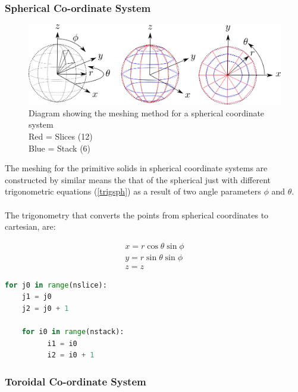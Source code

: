 \documentclass[12pt,a4paper]{article}
\begin{document}
\newpage
\subsubsection{Spherical Co-ordinate System}

\begin{figure}[h!]
\centering
\includegraphics[scale=0.5]{Images//Coords//sph.png}
\caption[width=\columnwidth]{Diagram showing the meshing method for a spherical coordinate system\\
Red = Slices (12)\\
Blue = Stack (6)}
\label{sphmeshin}
\end{figure}

The meshing for the primitive solids in spherical coordinate systems are constructed by similar means the that of the spherical just with different trigonometric equations (\ref{trigsph}) as a result of two angle parameters $\phi$ and $\theta$. 
\\\\
The trigonometry that converts the points from spherical coordinates to cartesian, are:

\begin{equation}
\begin{split}
x = r \cos{\theta}\sin{\phi}\\
y = r \sin{\theta}\sin{\phi} \\
z = z
\end{split}
\label{trigsph}
\end{equation}

\begin{lstlisting}[language=Python, caption=Python example]
for j0 in range(nslice):
    j1 = j0
    j2 = j0 + 1

    for i0 in range(nstack):
          i1 = i0
          i2 = i0 + 1
\end{lstlisting}

\newpage
\subsubsection{Toroidal Co-ordinate System}
\end{document}

